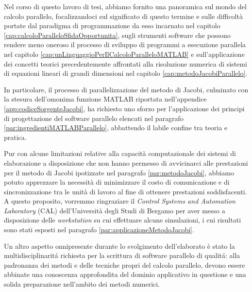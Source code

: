 Nel corso di questo lavoro di tesi, abbiamo fornito una panoramica sul mondo del calcolo parallelo, focalizzandoci sul significato di questo termine e sulle difficolt\`a portate dal paradigma di programmazione da esso incarnato nel capitolo \ref{cap:calcoloParalleloSfidaOpportunita}, sugli strumenti software che possono rendere meno oneroso il processo di sviluppo di programmi a esecuzione parallela
nel capitolo \ref{cap:unLinguaggioPerIlCalcoloParalleloMATLAB} e sull'applicazione dei concetti teorici precedentemente affrontati alla risoluzione numerica di sistemi di equazioni lineari di grandi dimensioni nel capitolo \ref{cap:metodoJacobiParallelo}.

In particolare, il processo di parallelizzazione del metodo di Jacobi, culminato con la stesura dell'omonima funzione 
MATLAB riportata nell'appendice \ref{app:codiceSorgenteJacobi}, ha richiesto uno sforzo per l'applicazione dei principi di progettazione del software parallelo elencati nel paragrafo \ref{par:ingredientiMATLABParallelo}, abbattendo il labile confine tra teoria e pratica.

Pur con alcune limitazioni relative alla capacit\`a computazionale dei sistemi di elaborazione a disposizione che non hanno 
permesso di avvicinarci alle prestazioni per il metodo di Jacobi ipotizzate nel paragrafo \ref{par:metodoJacobi}, 
abbiamo potuto apprezzare la necessit\`a di minimizzare il costo di comunicazione e di sincronizzazione tra le unit\`a di lavoro 
al fine di ottenere prestazioni soddisfacenti.\newline
A questo proposito, vorremmo ringraziare il \textit{Control Systems and Automation Laboratory} (CAL) dell'Universit\`a degli Studi 
di Bergamo per aver messo a disposizione delle \textit{workstation} su cui effettuare alcune simulazioni, i cui risultati sono stati esposti nel paragrafo \ref{par:applicazioneMetodoJacobi}.

Un altro aspetto onnipresente durante lo svolgimento dell'elaborato \`e stato la multidisciplinarit\'a richiesta per la scrittura 
di software parallelo di qualit\'a: alla padronanza dei metodi e delle tecniche propri del calcolo parallelo, devono essere 
abbinate una conoscenza approfondita del dominio applicativo in questione e una solida preparazione nell'ambito dei metodi numerici.

